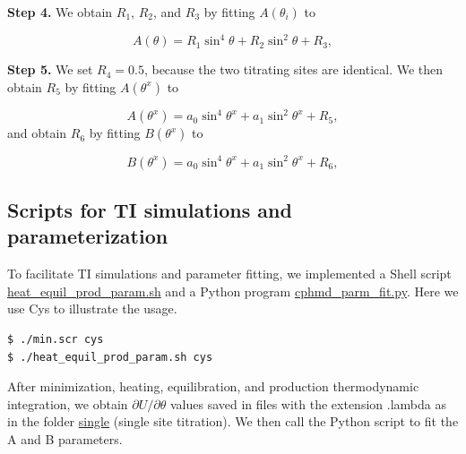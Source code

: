 \textbf{Step 4.}
We obtain $R_{1}$, $R_{2}$, and $R_{3}$ by fitting $A(\theta_i)$ to

\begin{equation}
    A\left(\theta\right) = R_{1}\sin^{4}\theta + R_{2}\sin^{2}\theta+R_{3},
\end{equation}

\textbf{Step 5.}
We set $R_{4}=0.5$, because the two titrating sites are identical. We then obtain $R_{5}$ by fitting $A(\theta^x)$ to

\begin{equation}
    A\left(\theta^{x}\right)=a_{0}\sin^{4}\theta^{x}+a_{1}\sin^{2}\theta^{x}+R_{5},
\end{equation}
and obtain $R_{6}$ by fitting $B(\theta^x)$ to

\begin{equation}
    B\left(\theta^{x}\right)=a_{0}\sin^{4}\theta^{x}+a_{1}\sin^{2}\theta^{x}+R_{6},
\end{equation}

\subsection{Scripts for TI simulations and parameterization}
To facilitate TI simulations and parameter fitting, we implemented a Shell script 
\href{https://gitlab.com/shenlab-amber-cphmd/cphmd-tutorial/-/blob/main/parameterization/scripts/heat_equil_prod_param.sh}{heat\_equil\_prod\_param.sh} and a Python program 
\href{
https://gitlab.com/shenlab-amber-cphmd/cphmd-tutorial/-/blob/main/parameterization/scripts/cphmd_parm_fit.py}{cphmd\_parm\_fit.py}.
Here we use Cys to illustrate the usage.

\begin{lstlisting}
$ ./min.scr cys
$ ./heat_equil_prod_param.sh cys
\end{lstlisting}

After minimization, heating, equilibration, and production thermodynamic integration, 
we obtain $\partial U/\partial\theta$ values saved in files with the extension .lambda as in the folder \href{https://gitlab.com/shenlab-amber-cphmd/cphmd-tutorial/-/tree/main/parameterization/single}{single} (single site titration). 
We then call the Python script to fit the A and B parameters.
 

